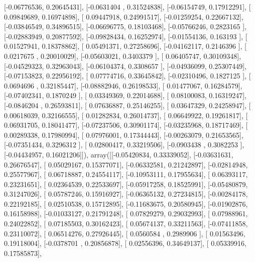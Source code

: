 \documentclass{article}
\begin{document}
       [-0.06776536,  0.20645431],
       [-0.0631404 ,  0.31524838],
       [-0.06154749,  0.17912291],
       [ 0.09849689,  0.16974898],
       [ 0.09447918,  0.24991517],
       [-0.01259254,  0.22667132],
       [-0.03846549,  0.34896515],
       [-0.06696775,  0.18103468],
       [-0.05766246,  0.2823165 ],
       [-0.02883949,  0.20877592],
       [-0.09828434,  0.16252974],
       [-0.01554136,  0.163193  ],
       [ 0.01527941,  0.18378862],
       [ 0.05491371,  0.27258696],
       [-0.04162117,  0.2146396 ],
       [ 0.0217675 ,  0.20010029],
       [-0.05603021,  0.3403379 ],
       [ 0.06405747,  0.30109348],
       [-0.04529323,  0.32963043],
       [-0.06104374,  0.3308657 ],
       [-0.04936099,  0.25307449],
       [-0.07153823,  0.22956192],
       [ 0.07774716,  0.33645842],
       [-0.02310496,  0.1827125 ],
       [ 0.0694696 ,  0.32185447],
       [-0.08882946,  0.26198533],
       [ 0.01477067,  0.16284579],
       [-0.07402341,  0.1870249 ],
       [ 0.03349369,  0.22014688],
       [ 0.08100083,  0.16319247],
       [-0.0846204 ,  0.26593811],
       [ 0.07636887,  0.25146255],
       [ 0.03647329,  0.24258947],
       [ 0.00618039,  0.32166555],
       [ 0.01282834,  0.26014737],
       [ 0.06649922,  0.19261817],
       [ 0.06931705,  0.18041477],
       [-0.07237506,  0.30901174],
       [-0.03235968,  0.18717469],
       [ 0.00289338,  0.17980994],
       [ 0.07976001,  0.17344443],
       [-0.00263079,  0.21653565],
       [-0.07351434,  0.3296312 ],
       [ 0.02800417,  0.33219506],
       [-0.0903438 ,  0.3082253 ],
       [-0.04434957,  0.16021206]]), array([[-0.05420834,  0.33339052],
       [-0.03631631,  0.26676547],
       [ 0.05029167,  0.15377071],
       [-0.06332581,  0.21242897],
       [-0.02814948,  0.25577967],
       [ 0.06718887,  0.24554117],
       [-0.10953111,  0.17955634],
       [ 0.06393117,  0.23231651],
       [ 0.02364539,  0.22533697],
       [-0.05917258,  0.18525991],
       [-0.05480879,  0.31247026],
       [ 0.05787246,  0.15916927],
       [-0.06365132,  0.27234815],
       [-0.00284178,  0.22192185],
       [ 0.02510538,  0.15712895],
       [-0.11683675,  0.20580945],
       [-0.01902876,  0.16158988],
       [-0.01033127,  0.21791248],
       [ 0.07829279,  0.29032993],
       [ 0.07988961,  0.24022852],
       [ 0.07185503,  0.30162423],
       [ 0.05674137,  0.33211563],
       [-0.07411858,  0.23110072],
       [ 0.06514276,  0.27926445],
       [ 0.0560584 ,  0.2989906 ],
       [ 0.01563496,  0.19118004],
       [-0.0378701 ,  0.20856878],
       [ 0.02556396,  0.34649137],
       [ 0.05339916,  0.17585873],
\end{document}
